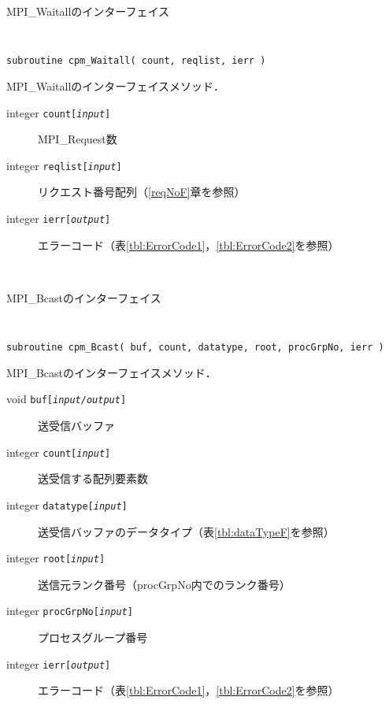 \begin{spacing}{0.8}
\begin{itembox}[l]{MPI\_Waitallのインターフェイス}
{\tt
\begin{verbatim}
subroutine cpm_Waitall( count, reqlist, ierr )
\end{verbatim}
}
MPI\_Waitallのインターフェイスメソッド．
\begin{description}
\item[integer {\tt count[{\it input}]}] MPI\_Request数
\item[integer {\tt reqlist[{\it input}]}] リクエスト番号配列（\ref{reqNoF}章を参照）
\item[integer {\tt ierr[{\it output}]}] エラーコード（表\ref{tbl:ErrorCode1}，\ref{tbl:ErrorCode2}を参照）
\end{description}
\end{itembox}\\
\end{spacing}

\begin{spacing}{0.8}
\begin{itembox}[l]{MPI\_Bcastのインターフェイス}
{\tt
\begin{verbatim}
subroutine cpm_Bcast( buf, count, datatype, root, procGrpNo, ierr )
\end{verbatim}
}
MPI\_Bcastのインターフェイスメソッド．
\begin{description}
\item[void    {\tt buf[{\it input/output}]}] 送受信バッファ
\item[integer {\tt count[{\it input}]}] 送受信する配列要素数
\item[integer {\tt datatype[{\it input}]}] 送受信バッファのデータタイプ（表\ref{tbl:dataTypeF}を参照）
\item[integer {\tt root[{\it input}]}] 送信元ランク番号（procGrpNo内でのランク番号）
\item[integer {\tt procGrpNo[{\it input}]}] プロセスグループ番号
\item[integer {\tt ierr[{\it output}]}] エラーコード（表\ref{tbl:ErrorCode1}，\ref{tbl:ErrorCode2}を参照）
\end{description}
\end{itembox}\\
\end{spacing}

